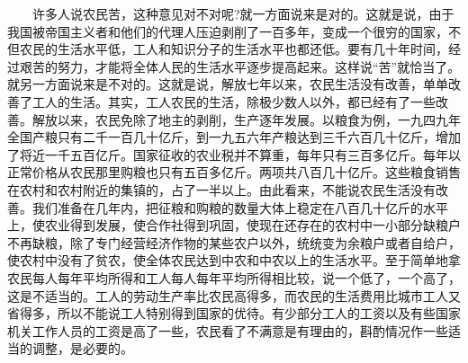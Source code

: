 \documentclass[cn,11pt,chinese]{elegantbook}
\begin{document}
　　许多人说农民苦，这种意见对不对呢?就一方面说来是对的。这就是说，由于我国被帝国主义者和他们的代理人压迫剥削了一百多年，变成一个很穷的国家，不但农民的生活水平低，工人和知识分子的生活水平也都还低。要有几十年时间，经过艰苦的努力，才能将全体人民的生活水平逐步提高起来。这样说“苦”就恰当了。就另一方面说来是不对的。这就是说，解放七年以来，农民生活没有改善，单单改善了工人的生活。其实，工人农民的生活，除极少数人以外，都已经有了一些改善。解放以来，农民免除了地主的剥削，生产逐年发展。以粮食为例，一九四九年全国产粮只有二千一百几十亿斤，到一九五六年产粮达到三千六百几十亿斤，增加了将近一千五百亿斤。国家征收的农业税并不算重，每年只有三百多亿斤。每年以正常价格从农民那里购粮也只有五百多亿斤。两项共八百几十亿斤。这些粮食销售在农村和农村附近的集镇的，占了一半以上。由此看来，不能说农民生活没有改善。我们准备在几年内，把征粮和购粮的数量大体上稳定在八百几十亿斤的水平上，使农业得到发展，使合作社得到巩固，使现在还存在的农村中一小部分缺粮户不再缺粮，除了专门经营经济作物的某些农户以外，统统变为余粮户或者自给户，使农村中没有了贫农，使全体农民达到中农和中农以上的生活水平。至于简单地拿农民每人每年平均所得和工人每人每年平均所得相比较，说一个低了，一个高了，这是不适当的。工人的劳动生产率比农民高得多，而农民的生活费用比城市工人又省得多，所以不能说工人特别得到国家的优待。有少部分工人的工资以及有些国家机关工作人员的工资是高了一些，农民看了不满意是有理由的，斟酌情况作一些适当的调整，是必要的。\\
\end{document}
